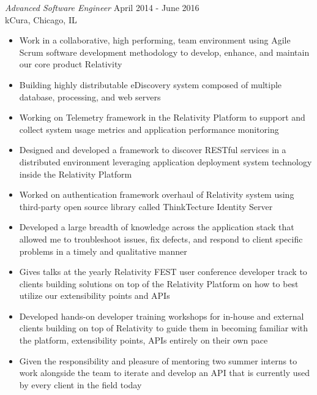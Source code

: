 \documentclass[margin]{res}
\newcommand{\tab}{\hspace*{2em}}
\begin{document}
\begin{resume}
{\sl Advanced Software Engineer} \hfill April 2014 - June 2016\\
	kCura, Chicago, IL		\tab	\tab\tab\tab\tab\tab\tab\tab			
	\begin{itemize}  \itemsep -2pt %
	\item Work in a collaborative, high performing, team environment using Agile Scrum software development methodology to develop, enhance, and maintain our core product Relativity
	\item Building highly distributable eDiscovery system composed of multiple database, processing, and web servers
	\item Working on Telemetry framework in the Relativity Platform to support and collect system usage metrics and application performance monitoring
	\item Designed and developed a framework to discover RESTful services in a distributed environment leveraging application deployment system technology inside the Relativity Platform
	\item Worked on authentication framework overhaul of Relativity system using third-party open source library called ThinkTecture Identity Server
	\item Developed a large breadth of knowledge across the application stack that allowed me to troubleshoot issues, fix defects, and respond to client specific problems in a timely and qualitative manner
	\item Gives talks at the yearly Relativity FEST user conference developer track to clients building solutions on top of the Relativity Platform on how to best utilize our extensibility points and APIs
	\item Developed hands-on developer training workshops for in-house and external clients building on top of Relativity to guide them in becoming familiar with the platform, extensibility points, APIs entirely on their own pace
	\item Given the responsibility and pleasure of mentoring two summer interns to work alongside the team to iterate and develop an API that is currently used by every client in the field today
			\end{itemize}


\end{resume}
\end{document}
